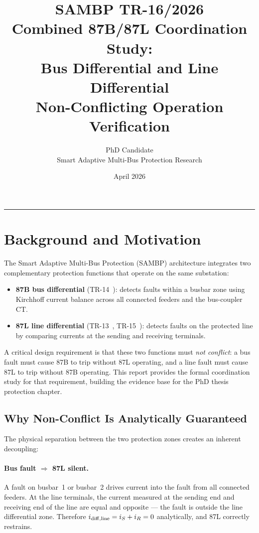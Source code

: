 \documentclass[11pt, a4paper]{article}
\title{\textbf{SAMBP TR-16/2026}\\[4pt]
       \large Combined 87B/87L Coordination Study:\\
       Bus Differential and Line Differential\\
       Non-Conflicting Operation Verification}
\author{PhD Candidate\\[2pt]
        \small Smart Adaptive Multi-Bus Protection Research}
\date{April 2026}
\begin{document}
\maketitle
\tableofcontents
\vspace{6pt}\hrule\vspace{10pt}

\section{Background and Motivation}
\label{sec:background}

The Smart Adaptive Multi-Bus Protection (SAMBP) architecture integrates two
complementary protection functions that operate on the same substation:

\begin{itemize}
  \item \textbf{87B bus differential} (TR-14~\cite{SAMBP_TR14}): detects
        faults within a busbar zone using Kirchhoff current balance across
        all connected feeders and the bus-coupler CT.
  \item \textbf{87L line differential} (TR-13~\cite{SAMBP_TR13},
        TR-15~\cite{SAMBP_TR15}): detects faults on the protected line by
        comparing currents at the sending and receiving terminals.
\end{itemize}

A critical design requirement is that these two functions must
\emph{not conflict}: a bus fault must cause 87B to trip without 87L
operating, and a line fault must cause 87L to trip without 87B operating.
This report provides the formal coordination study for that requirement,
building the evidence base for the PhD thesis protection chapter.

\subsection{Why Non-Conflict Is Analytically Guaranteed}

The physical separation between the two protection zones creates an inherent
decoupling:

\paragraph{Bus fault $\Rightarrow$ 87L silent.}
A fault on busbar~1 or busbar~2 drives current into the fault from all
connected feeders.  At the line terminals, the current measured at the
sending end and receiving end of the line are equal and opposite --- the
fault is outside the line differential zone.  Therefore $i_{\rm diff,line}
= i_S + i_R = 0$ analytically, and 87L correctly restrains.
\end{document}

